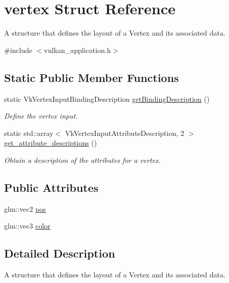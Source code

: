 \hypertarget{structvertex}{}\section{vertex Struct Reference}
\label{structvertex}


A structure that defines the layout of a Vertex and it\textquotesingle{}s associated data.  




{\ttfamily \#include $<$vulkan\+\_\+application.\+h$>$}

\subsection*{Static Public Member Functions}
\begin{DoxyCompactItemize}
\item 
static Vk\+Vertex\+Input\+Binding\+Description \mbox{\hyperlink{structvertex_a82fe1d8d34f8c58ee60dde244401ca55}{get\+Binding\+Description}} ()
\begin{DoxyCompactList}\small\item\em Define the vertex input. \end{DoxyCompactList}\item 
static std\+::array$<$ Vk\+Vertex\+Input\+Attribute\+Description, 2 $>$ \mbox{\hyperlink{structvertex_a0ee611b52cc36a4f5014a1fb6230cbc6}{get\+\_\+attribute\+\_\+descriptions}} ()
\begin{DoxyCompactList}\small\item\em Obtain a description of the attributes for a vertex. \end{DoxyCompactList}\end{DoxyCompactItemize}
\subsection*{Public Attributes}
\begin{DoxyCompactItemize}
\item 
glm\+::vec2 \mbox{\hyperlink{structvertex_ae79e06bf578bc411c75a3d35d91e020b}{pos}}
\item 
glm\+::vec3 \mbox{\hyperlink{structvertex_a6b9a4d49465117369bc1eb347e6e65b2}{color}}
\end{DoxyCompactItemize}


\subsection{Detailed Description}
A structure that defines the layout of a Vertex and it\textquotesingle{}s associated data. 


